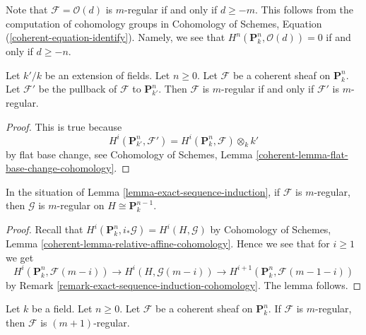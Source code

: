 \noindent
Note that $\mathcal{F} = \mathcal{O}(d)$ is $m$-regular if and only
if $d \geq -m$. This follows from the computation of cohomology groups
in Cohomology of Schemes, Equation (\ref{coherent-equation-identify}).
Namely, we see that $H^n(\mathbf{P}^n_k, \mathcal{O}(d)) = 0$
if and only if $d \geq -n$.

\begin{lemma}
\label{lemma-m-regular-extend-base-field}
Let $k'/k$ be an extension of fields. Let $n \geq 0$.
Let $\mathcal{F}$ be a coherent sheaf on $\mathbf{P}^n_k$.
Let $\mathcal{F}'$ be the pullback of $\mathcal{F}$ to $\mathbf{P}^n_{k'}$.
Then $\mathcal{F}$ is $m$-regular if and only if $\mathcal{F}'$ is
$m$-regular.
\end{lemma}

\begin{proof}
This is true because
$$
H^i(\mathbf{P}^n_{k'}, \mathcal{F}') =
H^i(\mathbf{P}^n_k, \mathcal{F}) \otimes_k k'
$$
by flat base change, see
Cohomology of Schemes, Lemma \ref{coherent-lemma-flat-base-change-cohomology}.
\end{proof}

\begin{lemma}
\label{lemma-m-regular}
In the situation of Lemma \ref{lemma-exact-sequence-induction},
if $\mathcal{F}$ is $m$-regular, then $\mathcal{G}$ is $m$-regular
on $H \cong \mathbf{P}^{n - 1}_k$.
\end{lemma}

\begin{proof}
Recall that $H^i(\mathbf{P}^n_k, i_*\mathcal{G}) = H^i(H, \mathcal{G})$ by
Cohomology of Schemes, Lemma \ref{coherent-lemma-relative-affine-cohomology}.
Hence we see that for $i \geq 1$ we get
$$
H^i(\mathbf{P}^n_k, \mathcal{F}(m - i)) \to
H^i(H, \mathcal{G}(m - i)) \to
H^{i + 1}(\mathbf{P}^n_k, \mathcal{F}(m - 1 - i))
$$
by Remark \ref{remark-exact-sequence-induction-cohomology}.
The lemma follows.
\end{proof}

\begin{lemma}
\label{lemma-m-regular-up}
Let $k$ be a field. Let $n \geq 0$.
Let $\mathcal{F}$ be a coherent sheaf on $\mathbf{P}^n_k$.
If $\mathcal{F}$ is $m$-regular, then $\mathcal{F}$ is
$(m + 1)$-regular.
\end{lemma}

